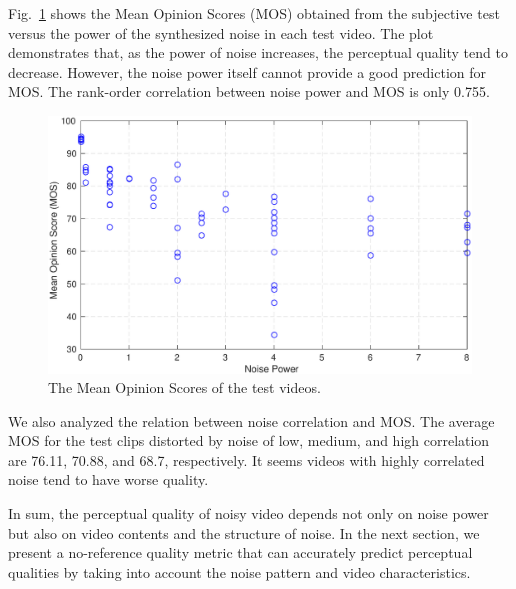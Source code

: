 \documentclass{sig-alternate}
\begin{document}
Fig.~\ref{fig:mos} shows the Mean Opinion Scores (MOS) obtained from the subjective test versus the power of the synthesized noise in each test video. The plot demonstrates that, as the power of noise increases, the perceptual quality tend to decrease. However, the noise power itself cannot provide a good prediction for MOS. The rank-order correlation between noise power and MOS is only 0.755. 
\begin{figure}[!hb]
	\centering
	\includegraphics[width=\columnwidth]{img/MOS.eps}
	\caption{\label{fig:mos} The Mean Opinion Scores of the test videos.}
\end{figure}

We also analyzed the relation between noise correlation and MOS. The average MOS for the test clips distorted by noise of low, medium, and high correlation are 76.11, 70.88, and 68.7, respectively. It seems videos with highly correlated noise tend to have worse quality. 

In sum, the perceptual quality of noisy video depends not only on noise power but also on video contents and the structure of noise. In the next section, we present a no-reference quality metric that can accurately predict perceptual qualities by taking into account the noise pattern and video characteristics.
\end{document}
